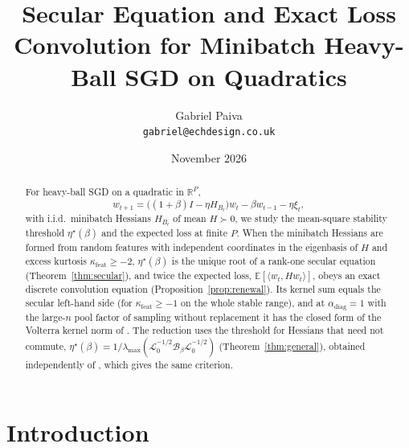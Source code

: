 \documentclass[11pt]{article}
\title{Secular Equation and Exact Loss Convolution for Minibatch Heavy-Ball SGD on Quadratics}
\author{Gabriel Paiva\\ \texttt{gabriel@echdesign.co.uk}}
\date{November 2026}
\theoremstyle{remark}
\newcommand{\E}{\mathbb{E}}
\newcommand{\R}{\mathbb{R}}
\begin{document}
\maketitle

\begin{abstract}
For heavy-ball SGD on a quadratic in $\R^P$,
\[
w_{t+1} = \big((1+\beta)I - \eta H_{B_t}\big)w_t - \beta w_{t-1} - \eta \xi_t,
\]
with i.i.d.\ minibatch Hessians $H_{B_t}$ of mean $H \succ 0$, we study the mean-square stability threshold $\eta^\star(\beta)$ and the expected loss at finite $P$. When the minibatch Hessians are formed from random features with independent coordinates in the eigenbasis of $H$ and excess kurtosis $\kappa_{\mathrm{feat}} \ge -2$, $\eta^\star(\beta)$ is the unique root of a rank-one secular equation (Theorem~\ref{thm:secular}), and twice the expected loss, $\E[\langle w_t, H w_t\rangle]$, obeys an exact discrete convolution equation (Proposition~\ref{prop:renewal}). Its kernel sum equals the secular left-hand side (for $\kappa_{\mathrm{feat}}\ge-1$ on the whole stable range), and at $\alpha_{\mathrm{diag}}=1$ with the large-$n$ pool factor of sampling without replacement it has the closed form of the Volterra kernel norm of \citet{lee2022minibatch}. The reduction uses the threshold for Hessians that need not commute, $\eta^\star(\beta) = 1/\lambda_{\max}(\mathcal L_0^{-1/2}\mathcal B_\beta\mathcal L_0^{-1/2})$ (Theorem~\ref{thm:general}), obtained independently of \citet[Theorem~F.1]{cai2026llm}, which gives the same criterion.
\end{abstract}

\section{Introduction}
\end{document}

